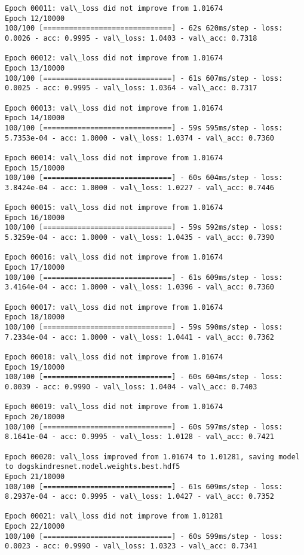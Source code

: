 \documentclass[11pt]{article}
\begin{document}
\begin{Verbatim}[commandchars=\\\{\}]
Epoch 00011: val\_loss did not improve from 1.01674
Epoch 12/10000
100/100 [==============================] - 62s 620ms/step - loss: 0.0026 - acc: 0.9995 - val\_loss: 1.0403 - val\_acc: 0.7318

Epoch 00012: val\_loss did not improve from 1.01674
Epoch 13/10000
100/100 [==============================] - 61s 607ms/step - loss: 0.0025 - acc: 0.9995 - val\_loss: 1.0364 - val\_acc: 0.7317

Epoch 00013: val\_loss did not improve from 1.01674
Epoch 14/10000
100/100 [==============================] - 59s 595ms/step - loss: 5.7353e-04 - acc: 1.0000 - val\_loss: 1.0374 - val\_acc: 0.7360

Epoch 00014: val\_loss did not improve from 1.01674
Epoch 15/10000
100/100 [==============================] - 60s 604ms/step - loss: 3.8424e-04 - acc: 1.0000 - val\_loss: 1.0227 - val\_acc: 0.7446

Epoch 00015: val\_loss did not improve from 1.01674
Epoch 16/10000
100/100 [==============================] - 59s 592ms/step - loss: 5.3259e-04 - acc: 1.0000 - val\_loss: 1.0435 - val\_acc: 0.7390

Epoch 00016: val\_loss did not improve from 1.01674
Epoch 17/10000
100/100 [==============================] - 61s 609ms/step - loss: 3.4164e-04 - acc: 1.0000 - val\_loss: 1.0396 - val\_acc: 0.7360

Epoch 00017: val\_loss did not improve from 1.01674
Epoch 18/10000
100/100 [==============================] - 59s 590ms/step - loss: 7.2334e-04 - acc: 1.0000 - val\_loss: 1.0441 - val\_acc: 0.7362

Epoch 00018: val\_loss did not improve from 1.01674
Epoch 19/10000
100/100 [==============================] - 60s 604ms/step - loss: 0.0039 - acc: 0.9990 - val\_loss: 1.0404 - val\_acc: 0.7403

Epoch 00019: val\_loss did not improve from 1.01674
Epoch 20/10000
100/100 [==============================] - 60s 597ms/step - loss: 8.1641e-04 - acc: 0.9995 - val\_loss: 1.0128 - val\_acc: 0.7421

Epoch 00020: val\_loss improved from 1.01674 to 1.01281, saving model to dogskindresnet.model.weights.best.hdf5
Epoch 21/10000
100/100 [==============================] - 61s 609ms/step - loss: 8.2937e-04 - acc: 0.9995 - val\_loss: 1.0427 - val\_acc: 0.7352

Epoch 00021: val\_loss did not improve from 1.01281
Epoch 22/10000
100/100 [==============================] - 60s 599ms/step - loss: 0.0023 - acc: 0.9990 - val\_loss: 1.0323 - val\_acc: 0.7341


\end{Verbatim}
\end{document}

